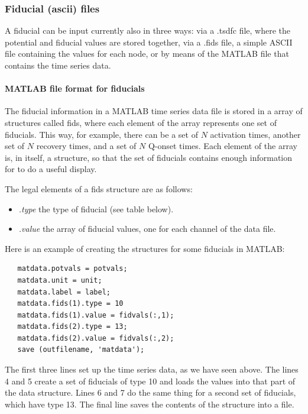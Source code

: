 \subsubsection{Fiducial (ascii) files}
\label{sec:fidfiles}

A fiducial can be input currently also in three ways: via a .tsdfc file,
where the potential and fiducial values are stored together, via a .fids
file, a simple ASCII file containing the values for each node, or by means
of the MATLAB file that contains the time series data.

\paragraph{MATLAB file format for fiducials}


The fiducial information in a MATLAB time series data file is stored in a
array of structures called fids, where each element of the array represents
one set of fiducials.  This way, for example, there can be a set of $N$
activation times, another set of $N$ recovery times, and a set of $N$
Q-onset times.  Each element of the array is, in itself, a structure, so
that the set of fiducials contains enough information for \map{} to do a
useful display. 

The legal elements of a fids structure are as follows:
%
\begin{itemize}
  \item \emph{.type} the type of fiducial (see table below).
  \item \emph{.value} the array of fiducial values, one for each 
    channel of the data file.
\end{itemize}


Here is an example of creating the structures for some fiducials in MATLAB:
%
\begin{verbatim}
   matdata.potvals = potvals;
   matdata.unit = unit;
   matdata.label = label;
   matdata.fids(1).type = 10
   matdata.fids(1).value = fidvals(:,1);
   matdata.fids(2).type = 13;
   matdata.fids(2).value = fidvals(:,2);
   save (outfilename, 'matdata');
\end{verbatim}

The first three lines set up the time series data, as we have seen above.
The lines 4 and 5 create a set of fiducials of type 10 and loads the values
into that part of the data structure.  Lines 6 and 7 do the same thing for
a second set of fiducials, which have type 13. The final line saves the
contents of the structure into a file.

